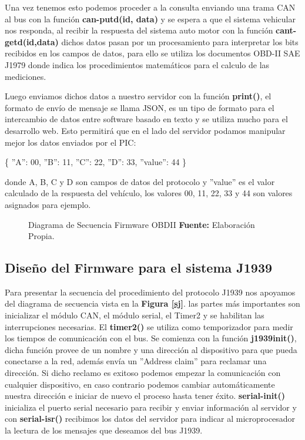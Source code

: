 Una vez tenemos esto podemos proceder a la consulta enviando una trama CAN al bus con la función {\bfseries can-putd(id, data)} y se espera a que el sistema vehicular nos responda, al recibir la respuesta del sistema auto motor con la función {\bfseries cant-getd(id,data)} dichos datos pasan por un procesamiento para interpretar los bits recibidos en los campos de datos, para ello se utiliza los documentos OBD-II SAE J1979 donde indica los procedimientos matemáticos para el calculo de las mediciones. 

Luego enviamos dichos datos a nuestro servidor con la función {\bfseries print()}, el formato de envío de mensaje se llama JSON, es un tipo de formato para el intercambio de datos entre software basado en texto y se utiliza mucho para el desarrollo web. Esto permitirá que en el lado del servidor podamos manipular mejor los datos enviados por el PIC: 

\{
	''A'':  00, 
	''B'': 11, 
	''C'': 22, 
	''D'': 33, 
	''value'': 44 \}

donde A, B, C y D son campos de datos del protocolo y ''value'' es el valor calculado de la respuesta del vehículo, los valores 00, 11, 22, 33 y 44 son valores asignados para ejemplo. 

 




\begin{figure}[H]
	\centering
	\begin{center}
		
	\end{center}
	\caption[Diagrama de Secuencia Firmware OBDII.]{Diagrama de Secuencia Firmware OBDII \textbf{ Fuente:} Elaboración Propia.}
	\label{sobd} %
\end{figure}



\subsection{Diseño del Firmware para el sistema J1939}
Para presentar la secuencia del procedimiento del protocolo J1939 nos apoyamos del diagrama de secuencia vista en la \textbf{Figura \ref{sj}}.
las partes más importantes son  inicializar el módulo CAN, el módulo serial, el Timer2 y se habilitan las interrupciones necesarias. 
El {\bfseries timer2()} se utiliza como temporizador para medir los tiempos de comunicación con el bus. 
Se comienza con la función {\bfseries j1939init()}, dicha función provee de un nombre y una dirección al dispositivo para que pueda conectarse a la red, además envía un ''Address claim'' para reclamar una dirección. Si dicho reclamo es exitoso podemos empezar la comunicación con cualquier dispositivo, en caso contrario podemos cambiar automáticamente nuestra dirección e iniciar de nuevo el proceso hasta tener éxito. {\bfseries serial-init()} inicializa el puerto serial necesario para recibir y enviar información al servidor y con {\bfseries serial-isr() } recibimos los datos del servidor para indicar al microprocesador la lectura de los mensajes que deseamos del bus J1939. 


